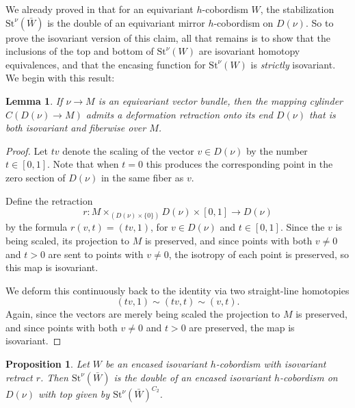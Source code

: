 \documentclass[11pt]{amsart}
\newtheorem{prop}{Proposition}[section]
\newtheorem{lem}{Lemma}[section]
\theoremstyle{definition}
\numberwithin{equation}{section}
\numberwithin{figure}{section}
\newcommand{\R}{\mathbb R}
\newcommand{\St}{\mathrm{St}}
\begin{document}



We already proved in \cite[Proposition 5.8]{GIMM1} that for an equivariant $h$-cobordism $W$, the stabilization $\St^\nu(\bar W)$ is the double of an equivariant mirror $h$-cobordism on $D(\nu)$. So to prove the isovariant version of this claim, all that remains is to show that the inclusions of the top and bottom of $\St^\nu(W)$ are isovariant homotopy equivalences, and that the encasing function for $\St^\nu(W)$ is \emph{strictly} isovariant. We begin with this result:
 
\begin{lem}\label{cylinder_isovariant}
	If $\nu \to M$ is an equivariant vector bundle, then the mapping cylinder $C(D(\nu) \to M)$ admits a deformation retraction onto its end $D(\nu)$ that is both isovariant and fiberwise over $M$.
\end{lem}

\begin{proof}
	Let $tv$ denote the scaling of the vector $v \in D(\nu)$ by the number $t \in [0,1]$. Note that when $t = 0$ this produces the corresponding point in the zero section of $D(\nu)$ in the same fiber as $v$.
	
	Define the retraction
	\[ r\colon M \times_{(D(\nu) \times \{0\})} D(\nu) \times [0,1] \to D(\nu) \]
	by the formula $r(v,t) = (tv,1)$, for $v \in D(\nu)$ and $t \in [0,1]$. Since the $v$ is being scaled, its projection to $M$ is preserved, and since points with both $v \neq 0$ and $t > 0$ are sent to points with $v \neq 0$, the isotropy of each point is preserved, so this map is isovariant.
	
	We deform this continuously back to the identity via two straight-line homotopies
	\[ (tv,1) \sim (tv,t) \sim (v,t). \]
	Again, since the vectors are merely being scaled the projection to $M$ is preserved, and since points with both $v \neq 0$ and $t > 0$ are preserved, the map is isovariant.
\end{proof}
	
\begin{prop}\label{stabiso}
	Let $W$ be an encased isovariant $h$-cobordism with isovariant retract $r$. Then $\St^\nu(\bar W)$ is the double of an encased isovariant $h$-cobordism on $D(\nu)$ with top given by $\St^\nu(\bar W)^{C_2}$.	\end{prop}
\end{document}
